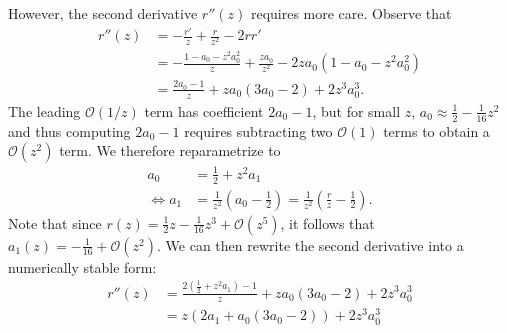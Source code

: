 \documentclass{article}
\begin{document}
However, the second derivative $r''(z)$ requires more care.
Observe that
%
\begin{align}
  r''(z) & = -\frac{r'}{z} + \frac{r}{z^2} - 2 r r'                                             \\
         & = -\frac{1 - a_0 - z^2 a_0^2}{z} + \frac{z a_0}{z^2} -  2 z a_0(1 - a_0 - z^2 a_0^2) \\
         & = \frac{2 a_0 - 1}{z} + z a_0 (3 a_0 - 2) + 2 z^3 a_0^3.
\end{align}
%
The leading $\mathcal{O}(1/z)$ term has coefficient $2a_0 - 1$, but for small $z$, $a_0 \approx \frac{1}{2} - \frac{1}{16}z^2$ and thus computing $2a_0 - 1$ requires subtracting two $\mathcal{O}(1)$ terms to obtain a $\mathcal{O}(z^2)$ term.
We therefore reparametrize to
%
\begin{align}
  a_0                 & = \frac{1}{2} + z^2 a_1 \label{eq:a0-reparametrized}                                                          \\
  \Leftrightarrow a_1 & = \frac{1}{z^2} (a_0 - \frac{1}{2}) = \frac{1}{z^2} (\frac{r}{z} - \frac{1}{2}). \label{eq:a1-reparametrized}
\end{align}
%
Note that since $r(z) = \frac{1}{2}z - \frac{1}{16}z^3 + \mathcal{O}(z^5)$, it follows that $a_1(z) = -\frac{1}{16} + \mathcal{O}(z^2)$.
We can then rewrite the second derivative into a numerically stable form:
%
\begin{align}
  r''(z) & = \frac{2(\frac{1}{2} + z^2 a_1)-1}{z} + z a_0 (3 a_0 - 2) + 2 z^3 a_0^3                 \\
         & = z (2a_1 + a_0 (3 a_0 - 2)) + 2 z^3 a_0^3 \label{eq:r-second-derivative-reparametrized}
\end{align}

\end{document}
